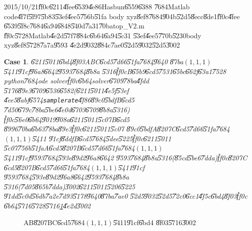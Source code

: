 \documentclass[12pt,a4paper]{article}
\newtheorem{case}[theorem]{Case}
\begin{document}
2015/10/21\U{ff0c}\U{6211}\U{4fee}\U{6539}\U{4e86}Hasbun\U{6559}\U{6388}%
\U{7684}Matlab code\U{4f7f}\U{5f97}\U{5b83}\U{53ef}\U{4ee5}\U{756b}\U{51fa}%
body xyz\U{8ef8}\U{7684}\U{904b}\U{52d5}\U{8ecc}\U{8de1}\U{ff0c}\U{4fee}%
\U{6539}\U{5f8c}\U{7684}\U{6a94}\U{6848}\U{540d}\U{7a31}\U{70ba}top\_V2.m%
\U{ff0c}\U{5728}Matlab\U{4e2d}\U{57f7}\U{884c}\U{6b64}\U{6a94}\U{5c31}%
\U{53ef}\U{4ee5}\U{770b}\U{5230}body xyz\U{8ef8}\U{5728}\U{7a7a}\U{9593}%
\U{4e2d}\U{9032}\U{884c}\U{7ae0}\U{52d5}\U{9032}\U{52d5}\U{3002}

\clearpage%

\begin{case}
\U{6211}\U{5011}\U{6bd4}\U{8f03}ABC\U{6cd5}\U{7d66}\U{51fa}\U{7684}\U{9640}%
\U{87ba}$(1,1,1)$\U{5411}\U{91cf}\U{96a8}\U{6642}\U{9593}\U{7684}\U{8b8a}%
\U{5316}\U{ff0c}B\U{65b9}\U{6cd5}\U{7531}\U{65bc}\U{662f}\U{63a1}\U{7528}%
python\U{7684}ode solver\U{ff0c}\U{6b64}solver\U{6709}\U{78ba}\U{4fdd}%
\U{5176}\U{89e3}\U{6709}\U{6536}\U{6582}(\U{6211}\U{5011}\U{4e5f}\U{53ef}%
\U{4ee5}\U{8abf}\U{6574}\texttt{samplerate}\U{4f86}\U{89c0}\U{5bdf}B\U{6cd5}%
\U{7d50}\U{679c}\U{78ba}\U{5be6}\U{4e0d}\U{6703}\U{6709}\U{8b8a}\U{5316})%
\U{ff0c}\U{56e0}\U{6b64}\U{9019}\U{908a}\U{6211}\U{5011}\U{5c07}B\U{6cd5}%
\U{8996}\U{70ba}\U{6b63}\U{78ba}\U{89e3}\U{ff0c}\U{6211}\U{5011}\U{5c07}%
\U{89c0}\U{5bdf}A\U{8207}C\U{6cd5}\U{7d66}\U{51fa}\U{7684}$(1,1,1)$\U{5411}%
\U{91cf}\U{8ddf}B\U{6cd5}\U{7684}\U{5dee}\U{5225}\U{ff0c}\U{6211}\U{5011}%
\U{5c07}\U{756b}\U{51fa}A\U{6cd5}\U{8207}B\U{6cd5}\U{7d66}\U{51fa}\U{7684}$%
(1,1,1)$\U{5411}\U{91cf}\U{9593}\U{7684}\U{593e}\U{89d2}\U{96a8}\U{6642}%
\U{9593}\U{7684}\U{8b8a}\U{5316}(\U{85cd}\U{5be6}\U{7dda})\U{ff0c}\U{8207}C%
\U{6cd5}\U{8207}B\U{6cd5}\U{7d66}\U{51fa}\U{7684}$(1,1,1)$\U{5411}\U{91cf}%
\U{9593}\U{7684}\U{593e}\U{89d2}\U{96a8}\U{6642}\U{9593}\U{7684}\U{8b8a}%
\U{5316}(\U{7d05}\U{865b}\U{7dda})\U{3002}\U{6211}\U{5011}\U{5206}\U{5225}%
\U{91dd}\U{5c0d}\U{56db}\U{7a2e}\U{7d93}\U{5178}\U{9640}\U{87ba}\U{7ae0}%
\U{52d5}\U{9032}\U{52d5}\U{72c0}\U{6cc1}\U{4f5c}\U{6bd4}\U{8f03}\U{ff0c}%
\U{6b64}\U{5716}\U{5728}\U{5716}\ref{ABCcompareFig}\U{4e2d}\U{3002}
\end{case}

\begin{figure}[th]
\caption{AB\U{8207}BC\U{6cd5}\U{7684}$(1,1,1)$\U{5411}\U{91cf}\U{6bd4}%
\U{8f03}\U{5716}\U{3002}}
\label{ABCcompareFig}
\begin{center}

\end{center}
\end{figure}
\end{document}
